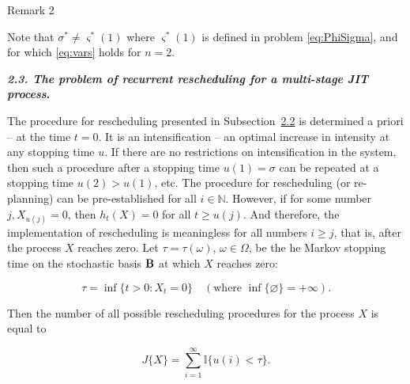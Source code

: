 \smallskip






\begin{newthm}{Remark 2}

Note that ${\sigma}^* \neq {{\varsigma}^*}(1)$ where ${{\varsigma}^*}(1)$ is defined in problem {\rm \eqref{eq:PhiSigma},} and for which \eqref{eq:vars} holds for $n = 2.$

\end{newthm}



\smallskip






\textbf{\emph{2.3. The problem of recurrent rescheduling for a multi-stage {JIT} process}.}

	The procedure for rescheduling presented in Subsection~\hyperlink{b:2.2}{2.2} is determined a priori – at the time $t = 0$. It is an intensification – an optimal increase in intensity at any stopping time $u$. If there are no restrictions on intensification in the system, then such a procedure after a stopping time $u(1) = \sigma$ can be repeated at a stopping time $u(2) > u(1)$, etc. The procedure for rescheduling (or re-planning) can be pre-established for all $i \in \mathbb{N}$. However, if for some number $j, X_{u(j)}=0$, then ${h_t}(X) = 0$ for all $t \geq u(j)$. And therefore, the implementation of rescheduling is meaningless for all numbers $i \geq j$, that is, after the process $X$ reaches zero. Let $\tau = \tau ( \omega )$, ${\omega \in \Omega}$, be the he Markov stopping time on the stochastic basis  ${\textbf B}$ at which $X$ reaches zero:

\begin{equation}\label{eq:tau}

	\tau=\inf{\{t>0 \colon X_t = 0}\}\quad (\text{where } \inf\{ \varnothing \}=+\infty).

\end{equation}

Then the number of all possible rescheduling procedures for the process $X$ is equal to

\begin{equation}\label{eq:JofX}

J\{ X\} = \sum_{i=1}^{\infty} \mathbb{I} \{u(i) < \tau \}.

\end{equation}

